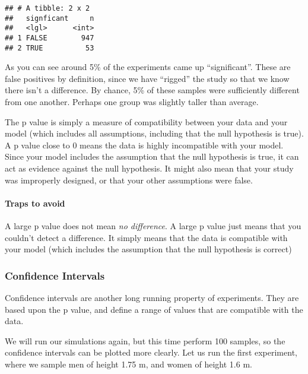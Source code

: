 \documentclass[
]{article}
\begin{document}
\begin{verbatim}
## # A tibble: 2 x 2
##   signficant     n
##   <lgl>      <int>
## 1 FALSE        947
## 2 TRUE          53
\end{verbatim}

As you can see around 5\% of the experiments came up ``significant''.
These are false positives by definition, since we have ``rigged'' the
study so that we know there isn't a difference. By chance, 5\% of these
samples were sufficiently different from one another. Perhaps one group
was slightly taller than average.

The p value is simply a measure of compatibility between your data and
your model (which includes all assumptions, including that the null
hypothesis is true). A p value close to 0 means the data is highly
incompatible with your model. Since your model includes the assumption
that the null hypothesis is true, it can act as evidence against the
null hypothesis. It might also mean that your study was improperly
designed, or that your other assumptions were false.

\hypertarget{traps-to-avoid-1}{%
\paragraph{Traps to avoid}\label{traps-to-avoid-1}}

A large p value does not mean \emph{no difference}. A large p value just
means that you couldn't detect a difference. It simply means that the
data is compatible with your model (which includes the assumption that
the null hypothesis is correct)

\hypertarget{confidence-intervals}{%
\subsubsection{Confidence Intervals}\label{confidence-intervals}}

Confidence intervals are another long running property of experiments.
They are based upon the p value, and define a range of values that are
compatible with the data.

We will run our simulations again, but this time perform 100 samples, so
the confidence intervals can be plotted more clearly. Let us run the
first experiment, where we sample men of height 1.75 m, and women of
height 1.6 m.
\end{document}
